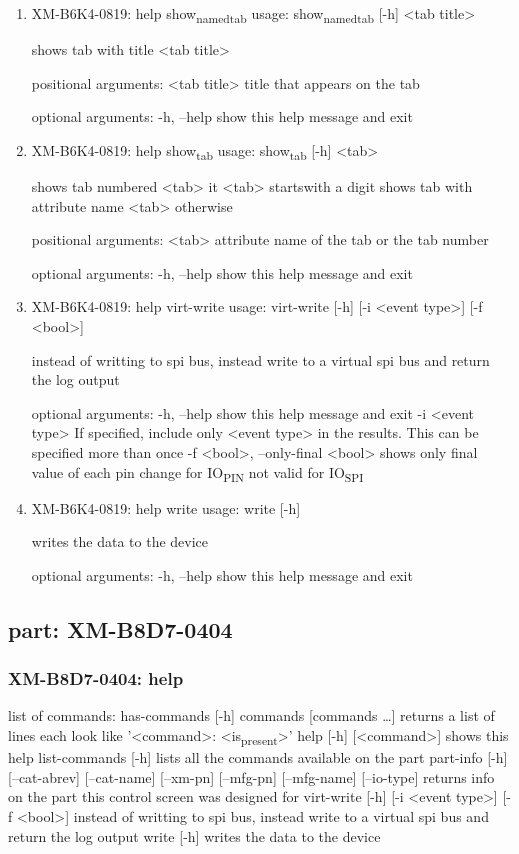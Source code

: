 \documentclass[11pt]{article}
\begin{document}
\begin{enumerate}
\item XM-B6K4-0819: help show\textsubscript{named}\textsubscript{tab}
\label{sec:org75f9adb}
usage: show\textsubscript{named}\textsubscript{tab} [-h] <tab title>

shows tab with title <tab title>

positional arguments:
  <tab title>  title that appears on the tab

optional arguments:
  -h, --help   show this help message and exit

\item XM-B6K4-0819: help show\textsubscript{tab}
\label{sec:org9e59aae}
usage: show\textsubscript{tab} [-h] <tab>

shows tab numbered <tab> it <tab> startswith a digit shows tab with attribute
name <tab> otherwise

positional arguments:
  <tab>       attribute name of the tab or the tab number

optional arguments:
  -h, --help  show this help message and exit

\item XM-B6K4-0819: help virt-write
\label{sec:orga9cd502}
usage: virt-write [-h] [-i <event type>] [-f <bool>]

instead of writting to spi bus, instead write to a virtual spi bus and return
the log output

optional arguments:
  -h, --help            show this help message and exit
  -i <event type>       If specified, include only <event type> in the
                        results. This can be specified more than once
  -f <bool>, --only-final <bool>
                        shows only final value of each pin change for IO\textsubscript{PIN}
                        not valid for IO\textsubscript{SPI}

\item XM-B6K4-0819: help write
\label{sec:org5ece9e1}
usage: write [-h]

writes the data to the device

optional arguments:
  -h, --help  show this help message and exit
\end{enumerate}

\subsection{part: XM-B8D7-0404}
\label{sec:org4d1bdf8}
\subsubsection{XM-B8D7-0404: help}
\label{sec:org0018679}
list of commands:
  has-commands [-h] commands [commands \ldots{}]
    returns a list of lines each look like '<command>: <is\textsubscript{present}>'
  help [-h] [<command>]
    shows this help
  list-commands [-h]
    lists all the commands available on the part
  part-info  [-h] [--cat-abrev] [--cat-name] [--xm-pn] [--mfg-pn] [--mfg-name]
          [--io-type]
    returns info on the part this control screen was designed for
  virt-write [-h] [-i <event type>] [-f <bool>]
    instead of writting to spi bus, instead write to a virtual spi bus
    and return the log output
  write [-h]
    writes the data to the device
\end{document}
